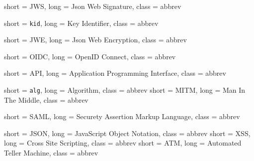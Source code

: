 

 {
    short = JWS,
    long = Json Web Signature,
    class = abbrev
}


 {
    short = \texttt{kid},
    long = Key Identifier,
    class = abbrev
}

 {
    short = JWE,
    long = Json Web Encryption,
    class = abbrev
}

 {
    short = OIDC,
    long = OpenID Connect,
    class = abbrev
}

 {
    short = API,
    long = Application Programming Interface,
    class = abbrev
}

 {
    short = \texttt{alg},
    long = Algorithm,
    class = abbrev
}
 {
    short = MITM,
    long = Man In The Middle,
    class = abbrev
}

 {
    short = SAML,
    long = Securety Assertion Markup Language,
    class = abbrev
}

 {
    short = JSON,
    long = JavaScript Object Notation,
    class = abbrev
}
 {
    short = XSS,
    long = Cross Site Scripting,
    class = abbrev
}
 {
    short = ATM,
    long = Automated Teller Machine,
    class = abbrev
}
